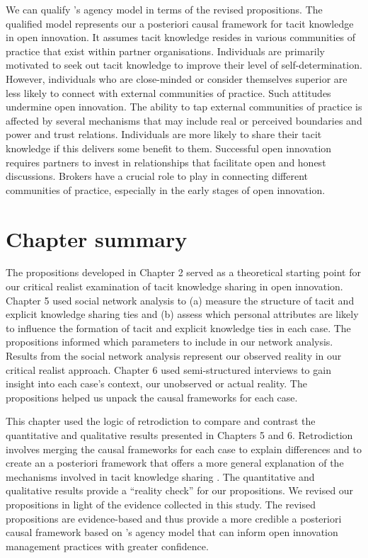 We can qualify \citeauthor{loyal2001agency}'s \citeyearpar{loyal2001agency} agency model in terms of the revised propositions. The qualified model represents our a posteriori causal framework for tacit knowledge in open innovation. It assumes tacit knowledge resides in various communities of practice that exist within partner organisations. Individuals are primarily motivated to seek out tacit knowledge to improve their level of self-determination. However, individuals who are close-minded or consider themselves superior are less likely to connect with external communities of practice. Such attitudes undermine open innovation. The ability to tap external communities of practice is affected by several mechanisms that may include real or perceived boundaries and power and trust relations. Individuals are more likely to share their tacit knowledge if this delivers some benefit to them. Successful open innovation requires partners to invest in relationships that facilitate open and honest discussions. Brokers have a crucial role to play in connecting different communities of practice, especially in the early stages of open innovation. \medskip

\section{Chapter summary}

The propositions developed in Chapter 2 served as a theoretical starting point for our critical realist examination of tacit knowledge sharing in open innovation. Chapter 5 used social network analysis to (a) measure the structure of tacit and explicit knowledge sharing ties and (b) assess which personal attributes are likely to influence the formation of tacit and explicit knowledge ties in each case. The propositions informed which parameters to include in our network analysis. Results from the social network analysis represent our observed reality in our critical realist approach. Chapter 6 used semi-structured interviews to gain insight into each case's context, our unobserved or actual reality. The propositions helped us unpack the causal frameworks for each case. \medskip

This chapter used the logic of retrodiction to compare and contrast the quantitative and qualitative results presented in Chapters 5 and 6. Retrodiction involves merging the causal frameworks for each case to explain differences and to create an a posteriori framework that offers a more general explanation of the mechanisms involved in tacit knowledge sharing \citep{welch2011theorising,mcavoy2018critical}. The quantitative and qualitative results provide a \enquote{reality check} for our propositions. We revised our propositions in light of the evidence collected in this study. The revised propositions are evidence-based and thus provide a more credible a posteriori causal framework based on \citeauthor{loyal2001agency}'s \citeyearpar{loyal2001agency} agency model that can inform open innovation management practices with greater confidence. \medskip

